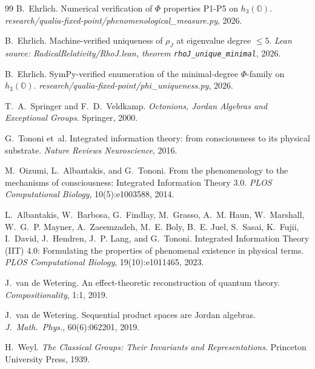 \documentclass[12pt]{article}
\theoremstyle{remark}
\begin{document}
\begin{thebibliography}{99}
B.~Ehrlich.
\newblock Numerical verification of $\Phi$ properties P1-P5 on $h_3(\mathbb{O})$.
\newblock \emph{research/qualia-fixed-point/phenomenological\_measure.py}, 2026.

B.~Ehrlich.
\newblock Machine-verified uniqueness of $\rho_J$ at eigenvalue degree $\leq 5$.
\newblock \emph{Lean source: RadicalRelativity/RhoJ.lean, theorem \texttt{rhoJ\_unique\_minimal}}, 2026.

B.~Ehrlich.
\newblock SymPy-verified enumeration of the minimal-degree $\Phi$-family on $h_3(\mathbb{O})$.
\newblock \emph{research/qualia-fixed-point/phi\_uniqueness.py}, 2026.

T.~A.~Springer and F.~D.~Veldkamp.
\newblock \emph{Octonions, Jordan Algebras and Exceptional Groups}.
\newblock Springer, 2000.

G.~Tononi et~al.
\newblock Integrated information theory: from consciousness to its physical substrate.
\newblock \emph{Nature Reviews Neuroscience}, 2016.

M.~Oizumi, L.~Albantakis, and G.~Tononi.
\newblock From the phenomenology to the mechanisms of consciousness: Integrated Information Theory 3.0.
\newblock \emph{PLOS Computational Biology}, 10(5):e1003588, 2014.

L.~Albantakis, W.~Barbosa, G.~Findlay, M.~Grasso, A.~M. Haun, W.~Marshall, W.~G.~P. Mayner, A.~Zaeemzadeh, M.~E. Boly, B.~E. Juel, S.~Sasai, K.~Fujii, I.~David, J.~Hendren, J.~P. Lang, and G.~Tononi.
\newblock Integrated Information Theory (IIT) 4.0: Formulating the properties of phenomenal existence in physical terms.
\newblock \emph{PLOS Computational Biology}, 19(10):e1011465, 2023.

J.~van de Wetering.
\newblock An effect-theoretic reconstruction of quantum theory.
\newblock \emph{Compositionality}, 1:1, 2019.

J.~van de Wetering.
\newblock Sequential product spaces are {J}ordan algebras.
\newblock \emph{J.~Math.\ Phys.}, 60(6):062201, 2019.

H.~Weyl.
\newblock \emph{The Classical Groups: Their Invariants and Representations}.
\newblock Princeton University Press, 1939.

\end{thebibliography}

\end{document}
